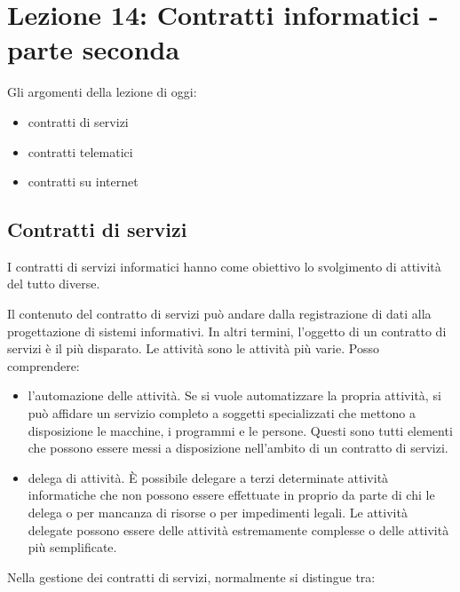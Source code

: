 \chapter{Lezione 14: Contratti informatici - parte seconda}

Gli argomenti della lezione di oggi:

\begin{itemize}
    \item contratti di servizi
    \item contratti telematici
    \item contratti su internet 
\end{itemize}


\section{Contratti di servizi} 
I contratti di servizi informatici hanno come obiettivo lo svolgimento di attività del tutto diverse. 

Il contenuto del contratto di servizi può andare dalla registrazione di dati alla progettazione di sistemi informativi. In altri termini, l'oggetto di un contratto di servizi è il più disparato. Le attività sono le attività più varie.
Posso comprendere:

\begin{itemize}
    \item l'automazione delle attività. Se si vuole automatizzare la propria attività, si può affidare un servizio completo a soggetti specializzati che mettono a disposizione le macchine, i programmi e le persone. Questi sono tutti elementi che possono essere messi a disposizione nell'ambito di un contratto di servizi. 
    \item delega di attività. È possibile delegare a terzi determinate attività informatiche che non possono essere effettuate in proprio da parte di chi le delega o per mancanza di risorse o per impedimenti legali. Le attività delegate possono essere delle attività estremamente complesse o delle attività più semplificate. 
\end{itemize}   

Nella gestione dei contratti di servizi, normalmente si distingue tra:

